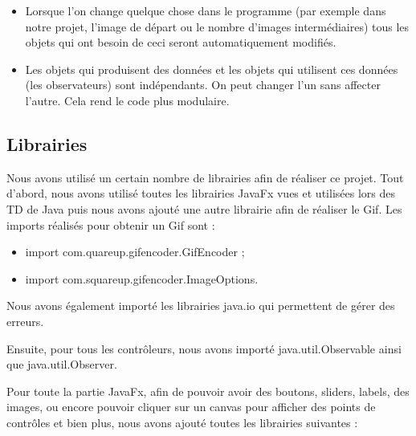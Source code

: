 \begin{itemize}
	\item Lorsque l’on change quelque chose dans le programme (par exemple dans notre projet, l’image de départ ou le nombre d’images intermédiaires) tous les objets qui ont besoin de ceci seront automatiquement modifiés.
	\item Les objets qui produisent des données  et les objets qui utilisent ces données (les observateurs) sont indépendants. On peut changer l'un sans affecter l'autre. Cela rend le code plus modulaire.
\end{itemize}




\subsection{Librairies}

Nous avons utilisé un certain nombre de librairies afin de réaliser ce projet. Tout d’abord, nous avons utilisé toutes les librairies JavaFx vues et utilisées lors des TD de Java puis nous avons ajouté une autre librairie afin de réaliser le Gif. Les imports réalisés pour obtenir un Gif sont : 

\begin{itemize}
	\item import com.quareup.gifencoder.GifEncoder ;
	\item import com.squareup.gifencoder.ImageOptions.
\end{itemize}


Nous avons également importé les librairies java.io qui permettent de gérer des erreurs.

Ensuite, pour tous les contrôleurs, nous avons importé java.util.Observable ainsi que java.util.Observer.

Pour toute la partie JavaFx, afin de pouvoir avoir des boutons, sliders, labels, des images, ou encore pouvoir cliquer sur un canvas pour afficher des points de contrôles et bien plus, nous avons ajouté toutes les librairies suivantes :


